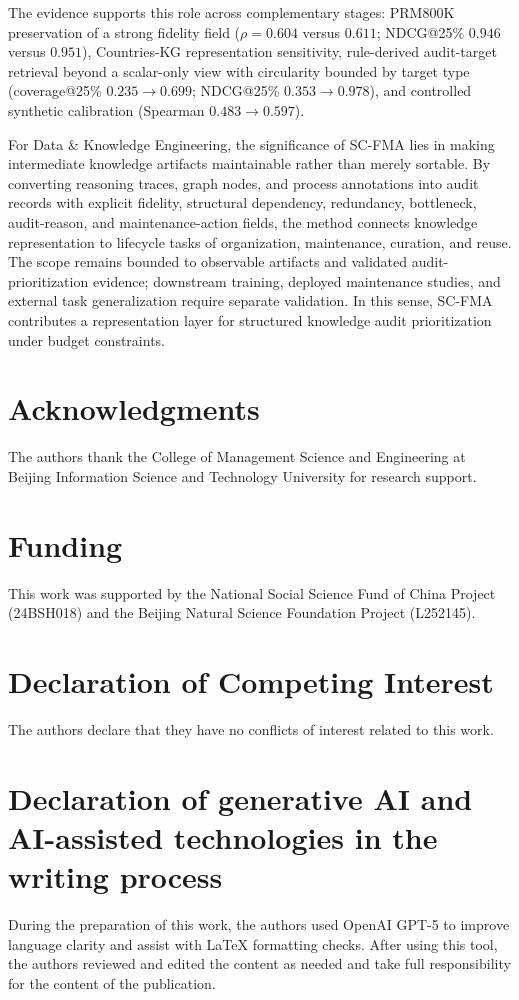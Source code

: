 \documentclass[a4paper,fleqn]{cas-sc}
\begin{document}
The evidence supports this role across complementary stages: PRM800K preservation of a strong fidelity field ($\rho = 0.604$ versus $0.611$; NDCG@25\% $0.946$ versus $0.951$), Countries-KG representation sensitivity, rule-derived audit-target retrieval beyond a scalar-only view with circularity bounded by target type (coverage@25\% $0.235 \rightarrow 0.699$; NDCG@25\% $0.353 \rightarrow 0.978$), and controlled synthetic calibration (Spearman $0.483 \rightarrow 0.597$).

For Data \& Knowledge Engineering, the significance of SC-FMA lies in making intermediate knowledge artifacts maintainable rather than merely sortable. By converting reasoning traces, graph nodes, and process annotations into audit records with explicit fidelity, structural dependency, redundancy, bottleneck, audit-reason, and maintenance-action fields, the method connects knowledge representation to lifecycle tasks of organization, maintenance, curation, and reuse. The scope remains bounded to observable artifacts and validated audit-prioritization evidence; downstream training, deployed maintenance studies, and external task generalization require separate validation. In this sense, SC-FMA contributes a representation layer for structured knowledge audit prioritization under budget constraints.

\section*{Acknowledgments}
The authors thank the College of Management Science and Engineering at Beijing Information Science and Technology University for research support.

\section*{Funding}
This work was supported by the National Social Science Fund of China Project (24BSH018) and the Beijing Natural Science Foundation Project (L252145).

\section*{Declaration of Competing Interest}
The authors declare that they have no conflicts of interest related to this work.

\section*{Declaration of generative AI and AI-assisted technologies in the writing process}
During the preparation of this work, the authors used OpenAI GPT-5 to improve language clarity and assist with LaTeX formatting checks. After using this tool, the authors reviewed and edited the content as needed and take full responsibility for the content of the publication.
\end{document}

